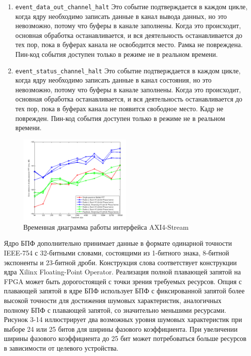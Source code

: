 \begin{enumerate}
	\item \verb|event_data_out_channel_halt|
	Это событие подтверждается в каждом цикле, когда ядру необходимо записать данные в канал вывода данных, но это невозможно, потому что буферы в канале заполнены. Когда это происходит, основная обработка останавливается, и вся деятельность останавливается до тех пор, пока в буферах канала не освободится место. Рамка не повреждена. Пин-код события доступен только в режиме не в реальном времени.
	\item \verb|event_status_channel_halt|
	Это событие подтверждается в каждом цикле, когда ядру необходимо записать данные в канал состояния, но это невозможно, потому что буферы в канале заполнены. Когда это происходит, основная обработка останавливается, и вся деятельность останавливается до тех пор, пока в буферах канала не появится свободное место. Кадр не поврежден. Пин-код события доступен только в режиме не в реальном времени.
\end{enumerate}

\begin{figure}[h]
	\centering
	\includegraphics[width=0.5\textwidth]{image/fft_xilinx_fp.png}
	\caption{Временная диаграмма работы интерфейса AXI4-Stream}
	\label{fft_detailed_implem}
\end{figure}

Ядро БПФ дополнительно принимает данные в формате одинарной точности IEEE-754 с 32-битными словами, состоящими из 1-битного знака, 8-битной экспоненты и 23-битной дроби. Конструкция слова соответствует конструкции ядра Xilinx Floating-Point Operator. Реализация полной плавающей запятой на FPGA может быть дорогостоящей с точки зрения требуемых ресурсов. Опция с плавающей запятой в ядре БПФ использует БПФ с фиксированной запятой более высокой точности для достижения шумовых характеристик, аналогичных полному БПФ с плавающей запятой, со значительно меньшими ресурсами. Рисунок 3-14 иллюстрирует два возможных уровня шумовых характеристик при выборе 24 или 25 битов для ширины фазового коэффициента. При увеличении ширины фазового коэффициента до 25 бит может потребоваться больше ресурсов в зависимости от целевого устройства.


